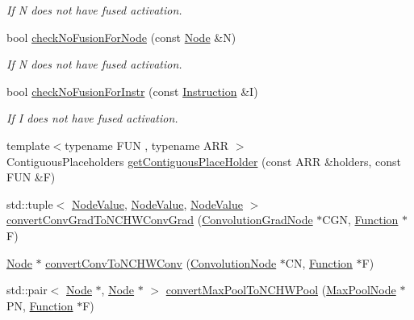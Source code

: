\begin{DoxyCompactItemize}
\begin{DoxyCompactList}\small\item\em If {\ttfamily N} does not have fused activation. \end{DoxyCompactList}\item 
bool \hyperlink{namespaceglow_ad4ca93d79211ec0bc67ed8524634e69a}{check\+No\+Fusion\+For\+Node} (const \hyperlink{classglow_1_1_node}{Node} \&N)
\begin{DoxyCompactList}\small\item\em If {\ttfamily N} does not have fused activation. \end{DoxyCompactList}\item 
bool \hyperlink{namespaceglow_a740e326204223c25d80b8b07e99dac18}{check\+No\+Fusion\+For\+Instr} (const \hyperlink{classglow_1_1_instruction}{Instruction} \&I)
\begin{DoxyCompactList}\small\item\em If {\ttfamily I} does not have fused activation. \end{DoxyCompactList}\item 
{\footnotesize template$<$typename F\+UN , typename A\+RR $>$ }\\Contiguous\+Placeholders \hyperlink{namespaceglow_ac81027b5844dd48c60ba42e8169f19c2}{get\+Contiguous\+Place\+Holder} (const A\+RR \&holders, const F\+UN \&F)
\item 
std\+::tuple$<$ \hyperlink{structglow_1_1_node_value}{Node\+Value}, \hyperlink{structglow_1_1_node_value}{Node\+Value}, \hyperlink{structglow_1_1_node_value}{Node\+Value} $>$ \hyperlink{namespaceglow_a277fade8bad1b16fc8c084ce52ba6f92}{convert\+Conv\+Grad\+To\+N\+C\+H\+W\+Conv\+Grad} (\hyperlink{classglow_1_1_convolution_grad_node}{Convolution\+Grad\+Node} $\ast$C\+GN, \hyperlink{classglow_1_1_function}{Function} $\ast$F)
\item 
\hyperlink{classglow_1_1_node}{Node} $\ast$ \hyperlink{namespaceglow_aeac40bd989fd3bcb403ecfbf8c120600}{convert\+Conv\+To\+N\+C\+H\+W\+Conv} (\hyperlink{classglow_1_1_convolution_node}{Convolution\+Node} $\ast$CN, \hyperlink{classglow_1_1_function}{Function} $\ast$F)
\item 
std\+::pair$<$ \hyperlink{classglow_1_1_node}{Node} $\ast$, \hyperlink{classglow_1_1_node}{Node} $\ast$ $>$ \hyperlink{namespaceglow_a67b90e6ec31547354c4e796d906cebd0}{convert\+Max\+Pool\+To\+N\+C\+H\+W\+Pool} (\hyperlink{classglow_1_1_max_pool_node}{Max\+Pool\+Node} $\ast$PN, \hyperlink{classglow_1_1_function}{Function} $\ast$F)
\item 

\end{DoxyCompactItemize}

